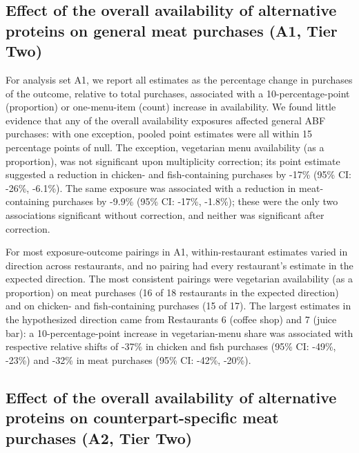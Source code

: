 
\subsection{Effect of the overall availability of alternative proteins on general meat purchases (A1, Tier Two)}

For analysis set A1, we report all estimates as the percentage change in purchases of the outcome, relative to total purchases, associated with a 10-percentage-point (proportion) or one-menu-item (count) increase in availability. We found little evidence that any of the overall availability exposures affected general ABF purchases: with one exception, pooled point estimates were all within 15 percentage points of null. The exception, vegetarian menu availability (as a proportion), was not significant upon multiplicity correction; its point estimate suggested a reduction in chicken- and fish-containing purchases by -17\% (95\% CI: -26\%, -6.1\%). The same exposure was associated with a reduction in meat-containing purchases by -9.9\% (95\% CI: -17\%, -1.8\%); these were the only two associations significant without correction, and neither was significant after correction.

For most exposure-outcome pairings in A1, within-restaurant estimates varied in direction across restaurants, and no pairing had every restaurant's estimate in the expected direction. The most consistent pairings were vegetarian availability (as a proportion) on meat purchases (16 of 18 restaurants in the expected direction) and on chicken- and fish-containing purchases (15 of 17). The largest estimates in the hypothesized direction came from Restaurants 6 (coffee shop) and 7 (juice bar): a 10-percentage-point increase in vegetarian-menu share was associated with respective relative shifts of -37\% in chicken and fish purchases (95\% CI: -49\%, -23\%) and -32\% in meat purchases (95\% CI: -42\%, -20\%).

\subsection{Effect of the overall availability of alternative proteins on counterpart-specific meat purchases (A2, Tier Two)}

